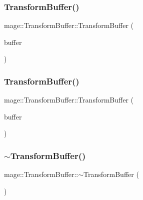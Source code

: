 \subsubsection{\texorpdfstring{Transform\+Buffer()}{TransformBuffer()}\hspace{0.1cm}{\footnotesize\ttfamily [2/3]}}
{\footnotesize\ttfamily mage\+::\+Transform\+Buffer\+::\+Transform\+Buffer (\begin{DoxyParamCaption}\item[{const \hyperlink{structmage_1_1_transform_buffer}{Transform\+Buffer} \&}]{buffer }\end{DoxyParamCaption})\hspace{0.3cm}{\ttfamily [default]}}

\hypertarget{structmage_1_1_transform_buffer_a6bba9485596567f70f8ef7b8d4a913a7}{}\label{structmage_1_1_transform_buffer_a6bba9485596567f70f8ef7b8d4a913a7} 
\subsubsection{\texorpdfstring{Transform\+Buffer()}{TransformBuffer()}\hspace{0.1cm}{\footnotesize\ttfamily [3/3]}}
{\footnotesize\ttfamily mage\+::\+Transform\+Buffer\+::\+Transform\+Buffer (\begin{DoxyParamCaption}\item[{\hyperlink{structmage_1_1_transform_buffer}{Transform\+Buffer} \&\&}]{buffer }\end{DoxyParamCaption})\hspace{0.3cm}{\ttfamily [default]}}

\hypertarget{structmage_1_1_transform_buffer_aac881d64eb39634d0e0e6cd8a13b6e2a}{}\label{structmage_1_1_transform_buffer_aac881d64eb39634d0e0e6cd8a13b6e2a} 
\subsubsection{\texorpdfstring{$\sim$\+Transform\+Buffer()}{~TransformBuffer()}}
{\footnotesize\ttfamily mage\+::\+Transform\+Buffer\+::$\sim$\+Transform\+Buffer (\begin{DoxyParamCaption}{ }\end{DoxyParamCaption})\hspace{0.3cm}{\ttfamily [default]}}



